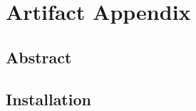\documentclass[nonacm,sigplan]{acmart}
\begin{document}
\appendix

\section{Artifact Appendix}
\subsection{Abstract}
\subsection{Installation}




\end{document}
